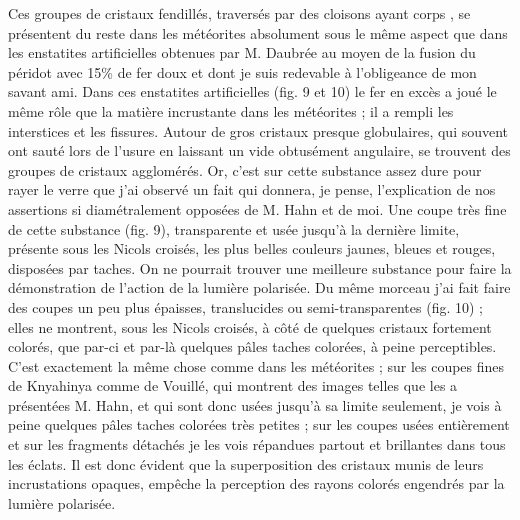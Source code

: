\documentclass[a4paper, 12pt, oneside, french]{book}
\begin{document}
Ces groupes de cristaux fendillés, traversés par des \og cloisons ayant corps \fg, se présentent du reste dans les météorites absolument sous le même aspect que dans les enstatites artificielles obtenues par M. Daubrée au moyen de la fusion du péridot avec 15\% de fer doux et dont je suis redevable à l'obligeance de mon savant ami. Dans ces enstatites artificielles (fig. 9 et 10) le fer en excès a joué le même rôle que la matière incrustante dans les météorites ; il a rempli les interstices et les fissures. Autour de gros cristaux presque globulaires, qui souvent ont sauté lors de l'usure en laissant un vide obtusément angulaire, se trouvent des groupes de cristaux agglomérés. Or, c'est sur cette substance assez dure pour rayer le verre que j'ai observé un fait qui donnera, je pense, l'explication de nos assertions si diamétralement opposées de M. Hahn et de moi. Une coupe très fine de cette substance (fig. 9), transparente et usée jusqu'à la dernière limite, présente sous les Nicols croisés, les plus belles couleurs jaunes, bleues et rouges, disposées par taches. On ne pourrait trouver une meilleure substance pour faire la démonstration de l'action de la lumière polarisée. Du même morceau j'ai fait faire des coupes un peu plus épaisses, translucides ou semi-transparentes (fig. 10) ; elles ne montrent, sous les Nicols croisés, à côté de quelques cristaux fortement colorés, que par-ci et par-là quelques pâles taches colorées, à peine perceptibles. C'est exactement la même chose comme dans les météorites ; sur les coupes fines de Knyahinya comme de Vouillé, qui montrent des images telles que les a présentées M. Hahn, et qui sont donc usées jusqu'à sa limite seulement, je vois à peine quelques pâles taches colorées très petites ; sur les coupes usées entièrement et sur les fragments détachés je les vois répandues partout et brillantes dans tous les éclats. Il est donc évident que la superposition des cristaux munis de leurs incrustations opaques, empêche la perception des rayons colorés engendrés par la lumière polarisée.
\end{document}
